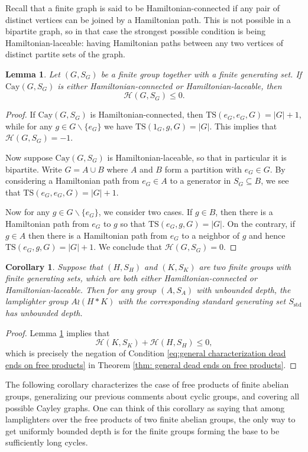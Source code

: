 \documentclass[reqno,oneside]{amsart}
\newcommand{\cay}[2]{\mathrm{Cay}(#1,#2)}
\newcommand{\std}{S_{\mathrm{std}}}
\newcommand{\TS}[3]{\mathrm{TS}\left(#1,#2,#3\right)}
\theoremstyle{plain}
\newtheorem{lem}[thm]{Lemma}
\newtheorem{cor}[thm]{Corollary}
\theoremstyle{definition}
\begin{document}
Recall that a finite graph is said to be Hamiltonian-connected if any pair of distinct vertices can be joined by a Hamiltonian path. This is not possible in a bipartite graph, so in that case the strongest possible condition is being Hamiltonian-laceable: having Hamiltonian paths between any two vertices of distinct partite sets of the graph.



\begin{lem}\label{lem: tsp in hamiltonian connected and hamiltonian laceable graphs}
	Let $(G,S_G)$ be a finite group together with a finite generating set. If $\cay{G}{S_G}$ is either Hamiltonian-connected or Hamiltonian-laceable, then
	$$
	\mathscr{H}(G,S_G)\le 0.
	$$
\end{lem}
\begin{proof}
	If $\cay{G}{S_G}$ is Hamiltonian-connected, then $\TS{e_G}{e_G}{G}=|G|+1$, while for any $g\in G\backslash\{e_G\}$ we have $\TS{1_G}{g}{G}=|G|$. This implies that $\mathscr{H}(G,S_G)=-1$.
	
	Now suppose $\cay{G}{S_G}$ is Hamiltonian-laceable, so that in particular it is bipartite. Write $G=A\cup B$ where $A$ and $B$ form a partition with $e_G\in G$. By considering a Hamiltonian path from $e_G\in A$ to a generator in $S_G\subseteq B$, we see that $\TS{e_G}{e_G}{G}=|G|+1$.
	
	Now for any $g\in G\backslash\{e_G\}$, we consider two cases. If $g\in B$, then there is a Hamiltonian path from $e_G$ to $g$ so that $\TS{e_G}{g}{G}=|G|$. On the contrary, if $g\in A$ then there is a Hamiltonian path from $e_G$ to a neighbor of $g$ and hence $\TS{e_G}{g}{G}=|G|+1$. We conclude that $\mathscr{H}(G,S_G)=0$.
\end{proof}


\begin{cor}\label{cor: free product of two hamiltonian connected or hamiltonian laceable has unbounded depth for lamplighter} Suppose that $(H,S_H)$ and $(K,S_K)$ are two finite groups with finite generating sets, which are both either Hamiltonian-connected or Hamiltonian-laceable. Then for any group $(A,S_A)$ with unbounded depth, the lamplighter group $A\wr(H*K)$ with the corresponding standard generating set $\std$ has unbounded depth. 
\end{cor}
\begin{proof}
	Lemma \ref{lem: tsp in hamiltonian connected and hamiltonian laceable graphs} implies that
	$$
	\mathscr{H}(K,S_K)+\mathscr{H}(H,S_H)\le 0,
	$$
	which is precisely the negation of Condition \eqref{eq:general characterization dead ends on free products} in Theorem \ref{thm: general dead ends on free products}.
\end{proof}
The following corollary characterizes the case of free products of finite abelian groups, generalizing our previous comments about cyclic groups, and covering all possible Cayley graphs. One can think of this corollary as saying that among lamplighters over the free products of two finite abelian groups, the only way to get uniformly bounded depth is for the finite groups forming the base to be sufficiently long cycles.
\end{document}
